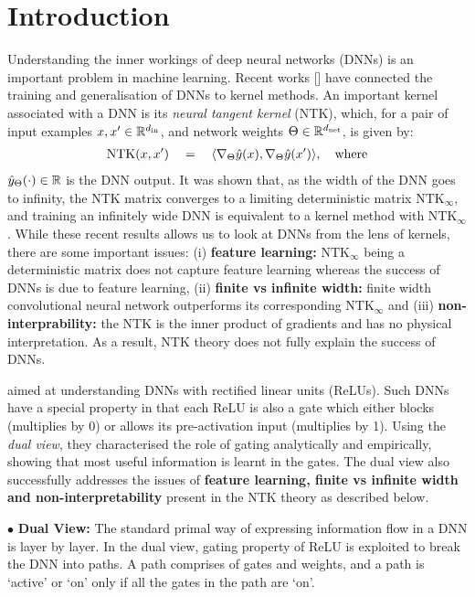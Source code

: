 \section{Introduction}
Understanding the inner workings of deep neural networks (DNNs) is an important problem in machine learning. Recent works [] have connected the training and generalisation of DNNs to kernel methods. An important kernel associated with a DNN is its \emph{neural tangent kernel} (NTK), which, for a pair of input examples $x,x'\in\mathbb{R}^{d_{\text{in}}}$, and network weights $\Theta\in\mathbb{R}^{d_{\text{net}}}$, is given by:
\begin{align*}
 \text{NTK}(x,x')\quad = \quad \langle \nabla_{\Theta}\hat{y}(x), \nabla_{\Theta}\hat{y}(x')\rangle, \quad\text{where}
\end{align*}
$\hat{y}_\Theta(\cdot)\in\mathbb{R}$ is the DNN output. It was shown that, as the width of the DNN goes to infinity, the NTK matrix converges to a limiting deterministic matrix $\text{NTK}_{\infty}$, and training an infinitely wide DNN is equivalent to a kernel method with $\text{NTK}_{\infty}$. While these recent results allows us to look at DNNs from the lens of kernels, there are some important issues: (i) \textbf{feature learning:} $\text{NTK}_{\infty}$ being a deterministic matrix does not capture feature learning whereas the success of DNNs is due to feature learning, (ii) \textbf{finite vs infinite width:} finite width convolutional neural network outperforms its corresponding $\text{NTK}_{\infty}$ and (iii)  \textbf{non-interprability:} the NTK is the inner product of gradients and has no physical interpretation. As a result, NTK theory does not fully explain the success of DNNs.

 \cite{npk} aimed at understanding DNNs with rectified linear units (ReLUs). Such DNNs have a special property in that each ReLU is also a gate which either blocks (multiplies by 0) or allows its pre-activation input (multiplies by 1). 
 Using the \emph{dual view}, they characterised the role of gating analytically and empirically, showing that most useful information is learnt in the gates. The dual view also successfully addresses the issues of \textbf{feature learning, finite vs infinite width and non-interpretability} present in the NTK theory as described below.

$\bullet$ \textbf{Dual View:}  The standard primal way of expressing information flow in a DNN is layer by layer. In the dual view, gating property of ReLU is exploited to break the DNN into paths. A path comprises of gates and weights, and a path is `active' or `on' only if all the gates in the path are `on'. %

